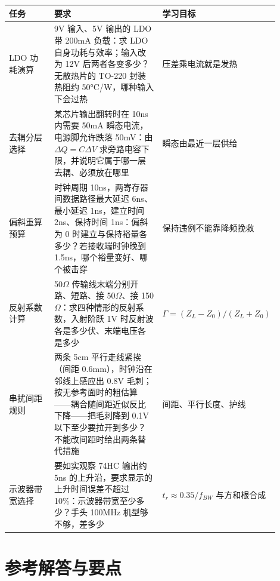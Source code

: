 \begin{longtable}{L{0.2\linewidth}L{0.5\linewidth}L{0.2\linewidth}}
\toprule
任务 & 要求 & 学习目标 \\
\midrule
LDO 功耗演算 & 9V 输入、5V 输出的 LDO 带 200mA 负载：求 LDO 自身功耗与效率；输入改为 12V 后两者各变多少？无散热片的 TO-220 封装热阻约 50°C/W，哪种输入下会过热 & 压差乘电流就是发热 \\
去耦分层选择 & 某芯片输出翻转时在 10ns 内需要 50mA 瞬态电流，电源脚允许跌落 50mV：由 $\Delta Q = C\Delta V$ 求旁路电容下限，并说明它属于哪一层去耦、必须放在哪里 & 瞬态由最近一层供给 \\
偏斜重算预算 & 时钟周期 10ns，两寄存器间数据路径最大延迟 6ns、最小延迟 1ns，建立时间 2ns、保持时间 1ns：偏斜为 0 时建立与保持裕量各多少？若接收端时钟晚到 1.5ns，哪个裕量变好、哪个被击穿 & 保持违例不能靠降频挽救 \\
反射系数计算 & 50$\Omega$ 传输线末端分别开路、短路、接 50$\Omega$、接 150$\Omega$：求四种情形的反射系数，入射阶跃 1V 时反射波各是多少伏、末端电压各是多少 & $\Gamma=(Z_L-Z_0)/(Z_L+Z_0)$ \\
串扰间距规则 & 两条 5cm 平行走线紧挨（间距 0.6mm），时钟沿在邻线上感应出 0.8V 毛刺；按无参考面时的粗估算——耦合随间距近似反比下降——把毛刺降到 0.1V 以下至少要拉开到多少？不能改间距时给出两条替代措施 & 间距、平行长度、护线 \\
示波器带宽选择 & 要如实观察 74HC 输出约 5ns 的上升沿，要求显示的上升时间误差不超过 10\%：示波器带宽至少多少？手头 100MHz 机型够不够，差多少 & $t_r \approx 0.35/f_{BW}$ 与方和根合成 \\
\bottomrule
\end{longtable}

\section*{参考解答与要点}

